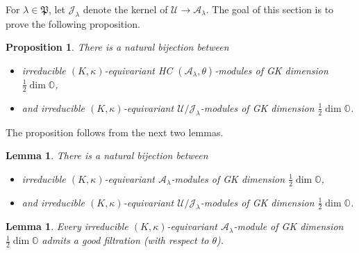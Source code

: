 \documentclass[12pt]{amsart}
\newcommand{\A}{\mathcal{A}}
\newcommand{\U}{\mathcal{U}}
\newcommand{\J}{\mathcal{J}}
\newcommand{\Orb}{\mathbb{O}}
\newcommand{\param}{\mathfrak{P}}
\newtheorem{Prop}[Thm]{Proposition}
\newtheorem{Lem}[Thm]{Lemma}
\theoremstyle{definition}
\numberwithin{equation}{section}
\begin{document}
For $\lambda\in \param$, let $\J_\lambda$ denote the kernel of $\U\rightarrow \A_\lambda$. The goal of this section is to prove the following
proposition.

\begin{Prop}\label{Prop:HC_bijection}
There is a natural bijection between
\begin{itemize}
\item irreducible $(K,\kappa)$-equivariant HC $(\A_\lambda,\theta)$-modules of GK dimension
$\frac{1}{2}\dim \Orb$,
\item and irreducible $(K,\kappa)$-equivariant $\U/\J_\lambda$-modules
of GK dimension $\frac{1}{2}\dim \Orb$.
\end{itemize}
\end{Prop}

The proposition follows from the next two lemmas.

\begin{Lem}\label{Lem:HC_bijection1}
There is a natural bijection between
\begin{itemize}
\item irreducible  $(K,\kappa)$-equivariant $\A_\lambda$-modules of GK dimension
$\frac{1}{2}\dim \Orb$,
\item and irreducible  $(K,\kappa)$-equivariant $\U/\J_\lambda$-modules
of GK dimension $\frac{1}{2}\dim \Orb$.
\end{itemize}
\end{Lem}

\begin{Lem}\label{Lem:HC_bijection2}
Every irreducible $(K,\kappa)$-equivariant $\A_\lambda$-module of GK dimension $\frac{1}{2}\dim \Orb$
admits a good filtration (with respect to $\theta$).
\end{Lem}
\end{document}
